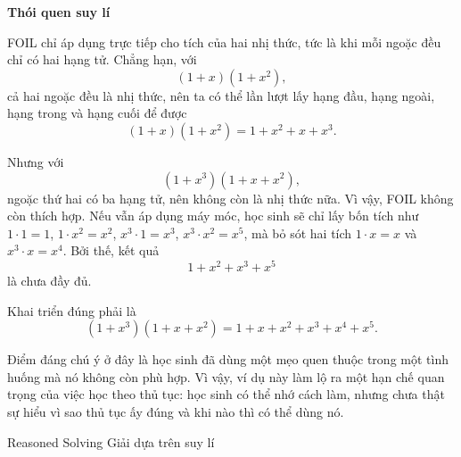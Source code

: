 {    \begin{hanglist}
      \vspace{\baselineskip}

      \vspace{\baselineskip}
    \end{hanglist}

    \textbf{Thói quen suy lí}

    \begin{hanglist}

      \vspace{\baselineskip}

    \end{hanglist}
  }
  {
    \vspace{.5\baselineskip}
    FOIL chỉ áp dụng trực tiếp cho tích của hai nhị thức, tức là khi mỗi ngoặc đều chỉ có hai hạng tử. Chẳng hạn, với
    $$
    (1+x)(1+x^2),
    $$
    cả hai ngoặc đều là nhị thức, nên ta có thể lần lượt lấy hạng đầu, hạng ngoài, hạng trong và hạng cuối để được
    $$
    (1+x)(1+x^2)=1+x^2+x+x^3.
    $$

    Nhưng với
    $$
    (1+x^3)(1+x+x^2),
    $$
    ngoặc thứ hai có ba hạng tử, nên không còn là nhị thức nữa. Vì vậy, FOIL không còn thích hợp. Nếu vẫn áp dụng máy móc, học sinh sẽ chỉ lấy bốn tích như $1\cdot1=1$, $1\cdot x^2=x^2$, $x^3\cdot1=x^3$, $x^3\cdot x^2=x^5$, mà bỏ sót hai tích $1\cdot x=x$ và $x^3\cdot x=x^4$. Bởi thế, kết quả
    $$
    1+x^2+x^3+x^5
    $$
    là chưa đầy đủ.

    Khai triển đúng phải là
    $$
    (1+x^3)(1+x+x^2)=1+x+x^2+x^3+x^4+x^5.
    $$

    Điểm đáng chú ý ở đây là học sinh đã dùng một mẹo quen thuộc trong một tình huống mà nó không còn phù hợp. Vì vậy, ví dụ này làm lộ ra một hạn chế quan trọng của việc học theo thủ tục: học sinh có thể nhớ cách làm, nhưng chưa thật sự hiểu vì sao thủ tục ấy đúng và khi nào thì có thể dùng nó.
  }

\ParallelSection
  {Reasoned Solving}
  {Giải dựa trên suy lí}
  {}

